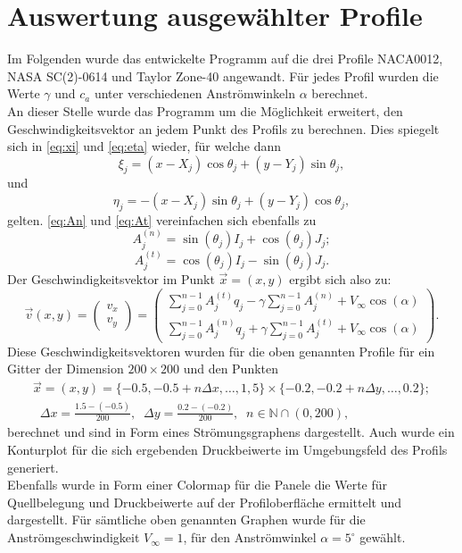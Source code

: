\section{Auswertung ausgewählter Profile}
\label{chap:profilauswertung}
Im Folgenden wurde das entwickelte Programm auf die drei Profile NACA0012, NASA SC(2)-0614 und Taylor Zone-40 angewandt. Für jedes Profil wurden die Werte $\gamma$ und $c_a$ unter verschiedenen Anströmwinkeln $\alpha $ berechnet. \\
An dieser Stelle wurde das Programm um die Möglichkeit erweitert, den Geschwindigkeitsvektor an jedem Punkt des Profils zu berechnen. Dies spiegelt sich in \eqref{eq:xi} und \eqref{eq:eta} wieder, für welche dann
\begin{equation}
\xi_{j} =  (x - X_j) \cos \theta _j + (y - Y_j) \sin \theta _j,
\end{equation}
und
\begin{equation}
\eta_{j} =  -(x - X_j) \sin \theta _j + (y - Y_j) \cos \theta _j,
\end{equation}
gelten. \eqref{eq:An} und \eqref{eq:At} vereinfachen sich ebenfalls zu
\begin{equation}
A_{j}^{(n)} = \sin {(\theta _j)} I_{j} + \cos{( \theta _j)} J_{j};
\end{equation}
\begin{equation}
A_{j}^{(t)} =  \cos{(\theta _j)} I_{j} - \sin{( \theta _j)} J_{j}.
\end{equation}
Der Geschwindigkeitsvektor im Punkt $\vec x = (x,y)$ ergibt sich also zu:
\begin{equation}
\vec v (x,y) = 
\begin{pmatrix}
v_x \\
v_y
\end{pmatrix}
=
\begin{pmatrix}
\sum_{j=0}^{n-1} A_{j}^{(t)} q_j - \gamma \sum_{j=0}^{n-1}A_{j}^{(n)} + V_{\infty} \cos{(\alpha)} \\
\sum_{j=0}^{n-1} A_{j}^{(n)} q_j + \gamma \sum_{j=0}^{n-1}A_{j}^{(t)} + V_{\infty} \cos{(\alpha)}
\end{pmatrix}.
\end{equation}
Diese Geschwindigkeitsvektoren wurden für die oben genannten Profile für ein Gitter der Dimension $200 \times 200$ und den Punkten
\begin{align*}
\vec x = (x,y) = \{-0.5, -0.5 + n \Delta x,\ldots, 1,5\} \times \{-0.2, -0.2 + n \Delta y, \ldots, 0.2\}; \\ \;\; \Delta x = \frac{1.5 - (-0.5)}{200}, \;\; \Delta y = \frac{0.2 - (-0.2)}{200}, \;\; n \in \mathbb{N} \cap (0,200),
\end{align*} 
berechnet und sind in Form eines Strömungsgraphens dargestellt. Auch wurde ein Konturplot für die sich ergebenden Druckbeiwerte im Umgebungsfeld des Profils generiert. \\
Ebenfalls wurde in Form einer Colormap für die Panele die Werte für Quellbelegung und Druckbeiwerte auf der Profiloberfläche ermittelt und dargestellt. Für sämtliche oben genannten Graphen wurde für die Anströmgeschwindigkeit $V_{\infty} = 1$, für den Anströmwinkel $\alpha =5^{\circ}$ gewählt.

